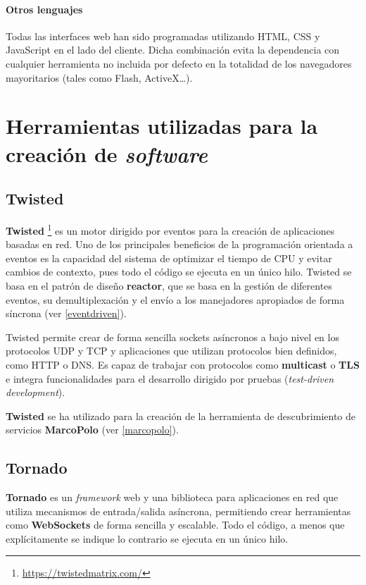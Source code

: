 \paragraph{Otros lenguajes\\}

Todas las interfaces web han sido programadas utilizando HTML, CSS y JavaScript en el lado del cliente. Dicha combinación evita la dependencia con cualquier herramienta no incluida por defecto en la totalidad de los navegadores mayoritarios (tales como Flash, ActiveX\dots).

\section{Herramientas utilizadas para la creación de \textit{software}}

\subsection{Twisted}

\textbf{Twisted} \footnote{\href{https://twistedmatrix.com/}{https://twistedmatrix.com/}} es un motor dirigido por eventos para la creación de aplicaciones basadas en red. Uno de los principales beneficios de la programación orientada a eventos es la capacidad del sistema de optimizar el tiempo de CPU y evitar cambios de contexto, pues todo el código se ejecuta en un único hilo. Twisted se basa en el patrón de diseño \textbf{reactor}\cite{Coplien95reactor}, que se basa en la gestión de diferentes eventos, su demultiplexación y el envío a los manejadores apropiados de forma síncrona (ver \ref{eventdriven}).

Twisted permite crear de forma sencilla sockets asíncronos a bajo nivel en los protocolos UDP y TCP y aplicaciones que utilizan protocolos bien definidos, como HTTP o DNS. Es capaz de trabajar con protocolos como \textbf{multicast} o \textbf{TLS} e integra funcionalidades para el desarrollo dirigido por pruebas (\textit{test-driven development}).

\textbf{Twisted} se ha utilizado para la creación de la herramienta de descubrimiento de servicios \textbf{MarcoPolo} (ver \ref{marcopolo}).

\subsection{Tornado}

\textbf{Tornado} es un \textit{framework} web y una biblioteca para aplicaciones en red que utiliza mecanismos de entrada/salida asíncrona, permitiendo crear herramientas como \textbf{WebSockets} de forma sencilla y escalable. Todo el código, a menos que explícitamente se indique lo contrario se ejecuta en un único hilo.


